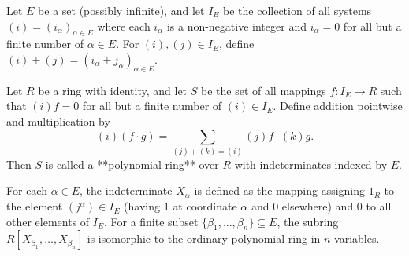 Let $E$ be a set (possibly infinite), and let $I_E$ be the collection of all systems $(i) = (i_\alpha)_{\alpha \in E}$ where each $i_\alpha$ is a non-negative integer and $i_\alpha = 0$ for all but a finite number of $\alpha \in E$. For $(i), (j) \in I_E$, define $(i) + (j) = (i_\alpha + j_\alpha)_{\alpha \in E}$.

Let $R$ be a ring with identity, and let $S$ be the set of all mappings $f: I_E \to R$ such that $(i)f = 0$ for all but a finite number of $(i) \in I_E$. Define addition pointwise and multiplication by
$$(i)(f \cdot g) = \sum_{(j)+(k)=(i)} (j)f \cdot (k)g.$$
Then $S$ is called a **polynomial ring** over $R$ with indeterminates indexed by $E$.

For each $\alpha \in E$, the indeterminate $X_\alpha$ is defined as the mapping assigning $1_R$ to the element $(j^\alpha) \in I_E$ (having $1$ at coordinate $\alpha$ and $0$ elsewhere) and $0$ to all other elements of $I_E$. For a finite subset $\{\beta_1, \dots, \beta_n\} \subseteq E$, the subring $R[X_{\beta_1}, \dots, X_{\beta_n}]$ is isomorphic to the ordinary polynomial ring in $n$ variables.
